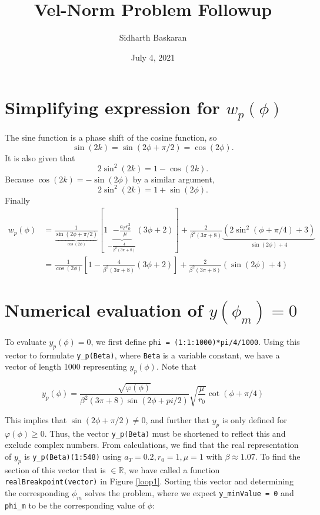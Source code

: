 \documentclass[11pt]{article}
\title{Vel-Norm Problem Followup}
\author{Sidharth Baskaran}
\date{July 4, 2021}
\begin{document}

\maketitle

\section{Simplifying expression for \texorpdfstring{$w_p(\phi)$}{}}

The sine function is a phase shift of the cosine function, so 
\begin{equation}
    \sin(2k)=\sin(2\phi+\pi/2)=\cos(2\phi).
\end{equation}
It is also given that
\begin{equation}
    2\sin^2(2k)=1-\cos(2k).
\end{equation}
Because $\cos(2k)=-\sin(2\phi)$ by a similar argument, 
\begin{equation}
    2\sin^2(2k)=1+\sin(2\phi).
\end{equation}
Finally
\begin{align}
    w_p(\phi)&=\frac{1}{\underbrace{\sin(2\phi+\pi/2)}_{\cos(2\phi)}}[1\underbrace{-\frac{a_Tr_0^2}{\mu}}_{-\frac{4}{\beta^2(3\pi+8)}}(3\phi+2)]+\frac{2}{\beta^2(3\pi+8)}\underbrace{(2\sin^2(\phi+\pi/4)+3)}_{\sin(2\phi)+4}\\
    &=\frac{1}{\cos(2\phi)}\left[1-\frac{4}{\beta^2(3\pi+8)}(3\phi+2)\right]+\frac{2}{\beta^2(3\pi+8)}(\sin(2\phi)+4)
\end{align}

\section{Numerical evaluation of \texorpdfstring{$y(\phi_m)=0$}{}}

To evaluate $y_p(\phi)=0$, we first define \verb|phi = (1:1:1000)*pi/4/1000|. 
Using this vector to formulate \verb|y_p(Beta)|, where \verb|Beta| is a variable constant, we have a vector of length 1000 representing $y_p(\phi)$.
Note that

\begin{equation}
    y_p(\phi)=\frac{\sqrt{\varphi(\phi)}}{\beta^2(3\pi+8)\sin(2\phi+pi/2)}\sqrt{\frac{\mu}{r_0}}\cot(\phi+\pi/4)
\end{equation}

This implies that $\sin(2\phi+\pi/2)\neq 0$, and further that $y_p$ is only defined for $\varphi(\phi)\geq 0$. Thus, the vector \verb|y_p(Beta)| must be shortened to reflect this and exclude complex numbers.
From calculations, we find that the real representation of $y_p$ is \verb|y_p(Beta)(1:548)| using $a_T=0.2,r_0=1,\mu=1$ with $\beta\approx 1.07$.
To find the section of this vector that is $\in \mathbb{R}$, we have called a function \verb|realBreakpoint(vector)| in Figure \ref{loop1}.
Sorting this vector and determining the corresponding $\phi_m$ solves the problem, where we expect \verb|y_minValue = 0| and \verb|phi_m| to be the corresponding value of $\phi$:
\end{document}
